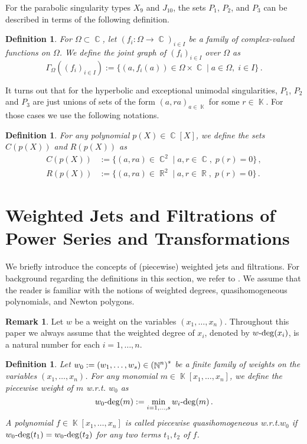 \documentclass[noend]{amsproc}
\newtheorem{defn}[theorem]{Definition}
\theoremstyle{definition}
\newtheorem{remark}[theorem]{Remark}
\let\originalleft\left
\let\originalright\right
\renewcommand{\left}{\mathopen{}\mathclose\bgroup\originalleft}
\renewcommand{\right}{\aftergroup\egroup\originalright}
\DeclareMathOperator{\N}{\mathbb{N}}
\DeclareMathOperator{\R}{\mathbb{R}}
\DeclareMathOperator{\C}{\mathbb{C}}
\DeclareMathOperator{\K}{\mathbb{K}}
\DeclareMathOperator{\dash}{\!\textnormal{-}\!}
\begin{document}
For the parabolic singularity types $X_9$ and $J_{10}$, the sets $P_1$, $P_2$,
and $P_3$ can be described in terms of the following definition.

\begin{defn}
For $\Omega \subset \C$, let $(f_i: \Omega \rightarrow \C)_{i \in I}$ be a
family of complex-valued functions on $\Omega$. We define the joint graph of
$(f_i)_{i \in I}$ over $\Omega$ as
\[
\Gamma_\Omega((f_i)_{i \in I})
:= \{ (a, f_i(a)) \in \Omega \times \C \mid a\in \Omega,\; i \in I \}\,.
\]
\end{defn}

It turns out that for the hyperbolic and exceptional unimodal singularities,
$P_1$, $P_2$ and $P_3$ are just unions of sets of the form $(a, ra)_{a \in \K}$
for some $r \in \K$. For those cases we use the following notations.

\begin{defn}
For any polynomial $p(X) \in \C[X]$, we define the sets $C(p(X))$ and $R(p(X))$
as
\begin{align*}
C(p(X)) &:= \{ (a, ra) \in \C^2 \mid a, r \in \C, \; p(r) = 0 \} \,, \\
R(p(X)) &:= \{ (a, ra) \in \R^2 \mid a, r \in \R, \; p(r) = 0 \} \,.
\end{align*}
\end{defn}


\section{Weighted Jets and Filtrations of Power Series and Transformations}

We briefly introduce the concepts of (piecewise) weighted jets and filtrations.
For background regarding the definitions in this section, we refer to
\citet{A1974}. We assume that the reader is familiar with the notions of
weighted degrees, quasihomogeneous polynomials, and Newton polygons.

\begin{remark}
Let $w$ be a weight on the variables $(x_1, \ldots, x_n)$. Throughout this
paper we always assume that the weighted degree of $x_i$, denoted by
$w\dash\deg(x_i)$, is a natural number for each $i = 1, \ldots, n$.
\end{remark}

\begin{defn}
Let $w_0 := (w_1, \ldots, w_s) \in \left(\N^n\right)^s$ be a finite family of
weights on the variables $(x_1, \ldots, x_n)$. For any monomial
$m \in \K[x_1,\ldots,x_n]$, we define the piecewise weight of $m$ w.r.t.\@
$w_0$ as
\[
w_0\dash\deg(m) := \min_{i = 1, \ldots, s} w_i\dash\deg(m) \,.
\]
A polynomial $f \in \K[x_1,\ldots,x_n]$ is called piecewise quasihomogeneous
w.r.t.\@ $w_0$ if $w_0\dash\deg(t_1) = w_0\dash\deg(t_2)$ for any two terms
$t_1, t_2$ of $f$.
\end{defn}
\end{document}
